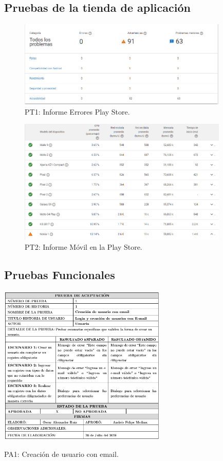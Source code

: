 \documentclass[12pt,letterpaper,openany]{book}
\begin{document}
\subsection{Pruebas de la tienda de aplicación}
\begin{figure}[H]
\begin{center}
\includegraphics[width=10cm]{./imagenes/Test/Informe_errores_play_store}
\caption{PT1: Informe Errores Play Store.}
\end{center}
\end{figure}

\begin{figure}[H]
\begin{center}
\includegraphics[width=10cm]{./imagenes/Test/Informe_movile_play_console}
\caption{PT2: Informe Móvil en la Play Store.}
\end{center}
\end{figure}

\subsection{Pruebas Funcionales}
\begin{table}[H]
\centering
\includegraphics[width=8cm]{./imagenes/PA/PA1}
\caption{PA1: Creación de usuario con email.}
\end{table}
\end{document}
